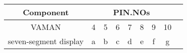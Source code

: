 \begin{tabular}{|c|c|c|c|c|c|c|c|c|}
\hline Component & \multicolumn{7}{|c|}{PIN.NOs} \\
\hline VAMAN & 4 & 5 & 6 & 7 & 8 & 9 & 10 \\
\hline seven-segment display & a & b & c & d & e & f & g \\
\hline
\end{tabular}
